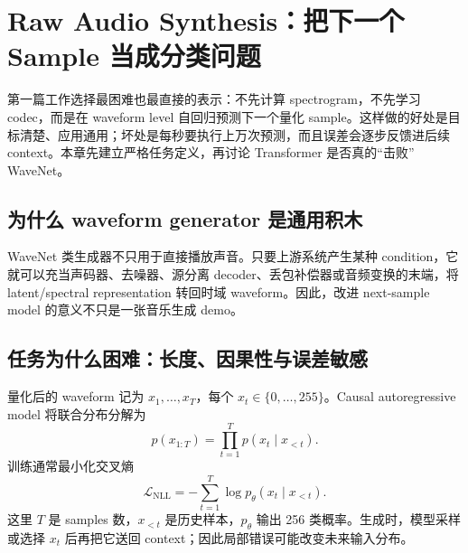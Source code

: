 \section{Raw Audio Synthesis：把下一个 Sample 当成分类问题}

第一篇工作选择最困难也最直接的表示：不先计算 spectrogram，不先学习 codec，而是在 waveform level 自回归预测下一个量化 sample。这样做的好处是目标清楚、应用通用；坏处是每秒要执行上万次预测，而且误差会逐步反馈进后续 context。本章先建立严格任务定义，再讨论 Transformer 是否真的“击败” WaveNet。


\subsection{为什么 waveform generator 是通用积木}

WaveNet 类生成器不只用于直接播放声音。只要上游系统产生某种 condition，它就可以充当声码器、去噪器、源分离 decoder、丢包补偿器或音频变换的末端，将 latent/spectral representation 转回时域 waveform。因此，改进 next-sample model 的意义不只是一张音乐生成 demo。



\subsection{任务为什么困难：长度、因果性与误差敏感}

量化后的 waveform 记为 $x_1,\ldots,x_T$，每个 $x_t\in\{0,\ldots,255\}$。Causal autoregressive model 将联合分布分解为
\[
p(x_{1:T})=\prod_{t=1}^{T}p(x_t\mid x_{<t}).
\]
训练通常最小化交叉熵
\[
\mathcal{L}_{\mathrm{NLL}}
=-\sum_{t=1}^{T}\log p_\theta(x_t\mid x_{<t}).
\]
这里 $T$ 是 samples 数，$x_{<t}$ 是历史样本，$p_\theta$ 输出 256 类概率。生成时，模型采样或选择 $x_t$ 后再把它送回 context；因此局部错误可能改变未来输入分布。


